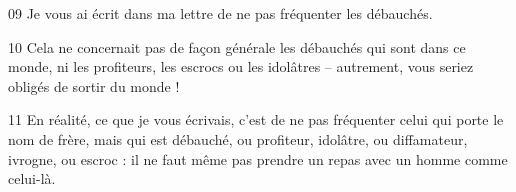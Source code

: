 
09 Je vous ai écrit dans ma lettre de ne pas fréquenter les débauchés.

10 Cela ne concernait pas de façon générale les débauchés qui sont dans ce monde, ni les profiteurs, les escrocs ou les idolâtres – autrement, vous seriez obligés de sortir du monde !

11 En réalité, ce que je vous écrivais, c’est de ne pas fréquenter celui qui porte le nom de frère, mais qui est débauché, ou profiteur, idolâtre, ou diffamateur, ivrogne, ou escroc : il ne faut même pas prendre un repas avec un homme comme celui-là.